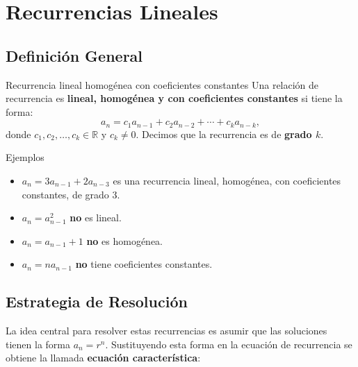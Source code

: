 


\section{Recurrencias Lineales}

\subsection{Definición General}

\begin{definitionblock}{Recurrencia lineal homogénea con coeficientes constantes}
Una relación de recurrencia es \textbf{lineal, homogénea y con coeficientes constantes} si tiene la forma:
\[
a_n = c_1 a_{n-1} + c_2 a_{n-2} + \cdots + c_k a_{n-k},
\]
donde $c_1, c_2, \dots, c_k \in \mathbb{R}$ y $c_k \neq 0$. Decimos que la recurrencia es de \textbf{grado $k$}.
\end{definitionblock}

\begin{exampleblock}{Ejemplos}
\begin{itemize}
    \item $a_n = 3a_{n-1} + 2a_{n-3}$ es una recurrencia lineal, homogénea, con coeficientes constantes, de grado $3$.
    \item $a_n = a_{n-1}^2$ \textbf{no} es lineal.
    \item $a_n = a_{n-1} + 1$ \textbf{no} es homogénea.
    \item $a_n = n a_{n-1}$ \textbf{no} tiene coeficientes constantes.
\end{itemize}
\end{exampleblock}

\subsection{Estrategia de Resolución}

La idea central para resolver estas recurrencias es asumir que las soluciones tienen la forma $a_n = r^n$. Sustituyendo esta forma en la ecuación de recurrencia se obtiene la llamada \textbf{ecuación característica}:

